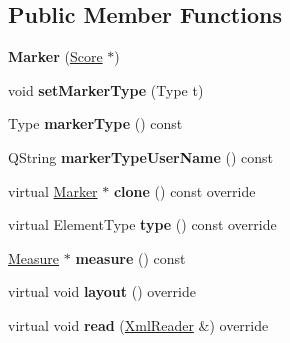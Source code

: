 \subsection*{Public Member Functions}
\begin{DoxyCompactItemize}
\item 
\mbox{\label{class_ms_1_1_marker_abe30566b3b72640b079974198cecb551}} 
{\bfseries Marker} (\hyperlink{class_ms_1_1_score}{Score} $\ast$)
\item 
\mbox{\label{class_ms_1_1_marker_a4e2f16d4fefd5922041ef58aade1bbae}} 
void {\bfseries set\+Marker\+Type} (Type t)
\item 
\mbox{\label{class_ms_1_1_marker_abeb02c5856d5d36c4494e72a0fd3d4da}} 
Type {\bfseries marker\+Type} () const
\item 
\mbox{\label{class_ms_1_1_marker_a2efcf26a436c18deec393a98c8bad33c}} 
Q\+String {\bfseries marker\+Type\+User\+Name} () const
\item 
\mbox{\label{class_ms_1_1_marker_a3275a59b2f8ac1a642524bd673b9befc}} 
virtual \hyperlink{class_ms_1_1_marker}{Marker} $\ast$ {\bfseries clone} () const override
\item 
\mbox{\label{class_ms_1_1_marker_aebd578bdf1321b4c91482787d5881893}} 
virtual Element\+Type {\bfseries type} () const override
\item 
\mbox{\label{class_ms_1_1_marker_a8482f5eb9c728ff07fc0b309966bd48c}} 
\hyperlink{class_ms_1_1_measure}{Measure} $\ast$ {\bfseries measure} () const
\item 
\mbox{\label{class_ms_1_1_marker_a798ba184f41d30a6d38a6dc5548567a6}} 
virtual void {\bfseries layout} () override
\item 
\mbox{\label{class_ms_1_1_marker_a94078b9d6c3d3654a8ec3e3b04480cbe}} 
virtual void {\bfseries read} (\hyperlink{class_ms_1_1_xml_reader}{Xml\+Reader} \&) override
\item 
\mbox{\label{class_ms_1_1_marker_a0b11d0130b934ae3abc66135231840c6}} 

\end{DoxyCompactItemize}
